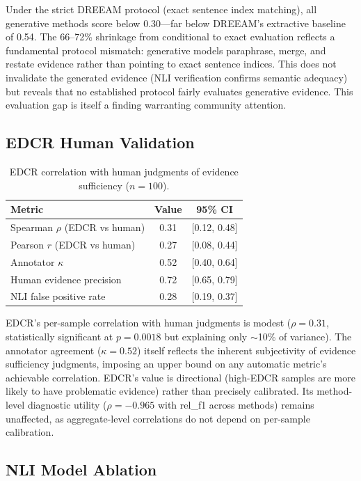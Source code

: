 \documentclass[11pt]{article}
\begin{document}
Under the strict DREEAM protocol (exact sentence index matching), all generative methods score below 0.30---far below DREEAM's extractive baseline of 0.54. The 66--72\% shrinkage from conditional to exact evaluation reflects a fundamental protocol mismatch: generative models paraphrase, merge, and restate evidence rather than pointing to exact sentence indices. This does not invalidate the generated evidence (NLI verification confirms semantic adequacy) but reveals that no established protocol fairly evaluates generative evidence. This evaluation gap is itself a finding warranting community attention.

\subsection{EDCR Human Validation}
\label{sec:edcr_human}

\begin{table}[h]
\centering
\caption{EDCR correlation with human judgments of evidence sufficiency ($n=100$).}
\label{tab:edcr_human}
\begin{tabular}{lcc}
\toprule
\textbf{Metric} & \textbf{Value} & \textbf{95\% CI} \\
\midrule
Spearman $\rho$ (EDCR vs human) & 0.31 & [0.12, 0.48] \\
Pearson $r$ (EDCR vs human) & 0.27 & [0.08, 0.44] \\
Annotator $\kappa$ & 0.52 & [0.40, 0.64] \\
Human evidence precision & 0.72 & [0.65, 0.79] \\
NLI false positive rate & 0.28 & [0.19, 0.37] \\
\bottomrule
\end{tabular}
\end{table}

EDCR's per-sample correlation with human judgments is modest ($\rho=0.31$, statistically significant at $p=0.0018$ but explaining only $\sim$10\% of variance). The annotator agreement ($\kappa=0.52$) itself reflects the inherent subjectivity of evidence sufficiency judgments, imposing an upper bound on any automatic metric's achievable correlation. EDCR's value is directional (high-EDCR samples are more likely to have problematic evidence) rather than precisely calibrated. Its method-level diagnostic utility ($\rho=-0.965$ with rel\_f1 across methods) remains unaffected, as aggregate-level correlations do not depend on per-sample calibration.

\subsection{NLI Model Ablation}
\end{document}
